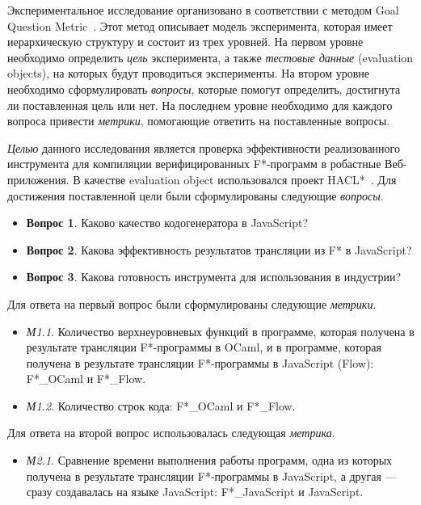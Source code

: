 \documentclass[12pt]{matmex-diploma}
\begin{document}
Экспериментальное исследование организовано в соответствии с методом Goal Question Metric~\cite{van2002goal}. Этот метод описывает модель эксперимента, которая имеет иерархическую структуру и состоит из трех уровней. На первом уровне необходимо определить \textit{цель} эксперимента, а также \textit{тестовые данные} (evaluation objects), на которых будут проводиться эксперименты. На втором уровне необходимо сформулировать \textit{вопросы}, которые помогут определить, достигнута ли поставленная цель или нет. На последнем уровне необходимо для каждого вопроса привести \textit{метрики}, помогающие ответить на поставленные вопросы. 

\textit{Целью} данного исследования является проверка эффективности реализованного инструмента для компиляции верифицированных F*-программ в робастные Веб-приложения. В качестве evaluation object использовался проект HACL*~\cite{hacl_star}. Для достижения поставленной цели были сформулированы следующие \textit{вопросы}.

\begin{itemize}
\item[] \textbf{Вопрос 1}. Каково качество кодогенератора в JavaScript?
\item[] \textbf{Вопрос 2}. Какова эффективность результатов трансляции из F* в JavaScript?
\item[] \textbf{Вопрос 3}. Какова готовность инструмента для использования в индустрии?
\end{itemize}

Для ответа на первый вопрос были сформулированы следующие \textit{метрики}.

\begin{itemize}
\item[] \textit{М1.1}. Количество верхнеуровневых функций в программе, которая получена в результате трансляции F*-программы в OCaml, и в программе, которая получена в результате трансляции F*-программы в JavaScript (Flow): F*\_OCaml и F*\_Flow.
\item[] \textit{М1.2}. Количество строк кода: F*\_OCaml и F*\_Flow.
\end{itemize}

Для ответа на второй вопрос использовалась следующая \textit{метрика}.

\begin{itemize}
\item[] \textit{М2.1}. Сравнение времени выполнения работы программ, одна из которых получена в результате трансляции F*-программы в JavaScript, а другая --- сразу создавалась на языке JavaScript: F*\_JavaScript и JavaScript.
\end{itemize}
\end{document}
